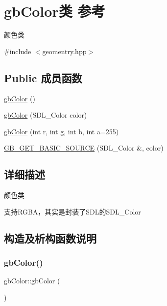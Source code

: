\hypertarget{classgb_color}{}\section{gb\+Color类 参考}
\label{classgb_color}


颜色类  




{\ttfamily \#include $<$geomentry.\+hpp$>$}

\subsection*{Public 成员函数}
\begin{DoxyCompactItemize}
\item 
\mbox{\hyperlink{classgb_color_a8e2a9d60e52e47eddd01e977c8a34a18}{gb\+Color}} ()
\item 
\mbox{\hyperlink{classgb_color_a41c052aa6944c5e3951ad25534d13aa1}{gb\+Color}} (S\+D\+L\+\_\+\+Color color)
\item 
\mbox{\hyperlink{classgb_color_afd3f890cacd7ce4eb3f71aac1153d6a2}{gb\+Color}} (int r, int g, int b, int a=255)
\item 
\mbox{\hyperlink{classgb_color_aa1cfdc1c48c31e1859f4a13331c72a09}{G\+B\+\_\+\+G\+E\+T\+\_\+\+B\+A\+S\+I\+C\+\_\+\+S\+O\+U\+R\+CE}} (S\+D\+L\+\_\+\+Color \&, color)
\end{DoxyCompactItemize}


\subsection{详细描述}
颜色类 

支持\+R\+G\+B\+A，其实是封装了\+S\+D\+L的\+S\+D\+L\+\_\+\+Color 

\subsection{构造及析构函数说明}
\mbox{\label{classgb_color_a8e2a9d60e52e47eddd01e977c8a34a18}} 
\subsubsection{\texorpdfstring{gbColor()}{gbColor()}\hspace{0.1cm}{\footnotesize\ttfamily [1/3]}}
{\footnotesize\ttfamily gb\+Color\+::gb\+Color (\begin{DoxyParamCaption}{ }\end{DoxyParamCaption})}

